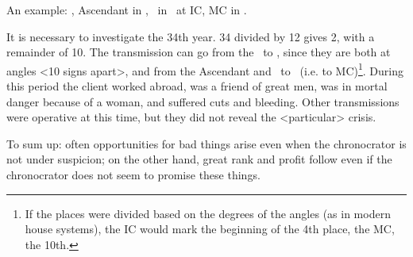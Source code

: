 An example: \Mars, Ascendant in \Virgo, \Moon\, in \Scorpio\, at IC, MC in \Taurus. 


It is necessary to investigate the 34th year. 34 divided by 12 gives 2, with a remainder of 10. The transmission can go from the \Moon\, to \Mars, since they are both at angles <10 signs apart>, and from the Ascendant and \Mars\, to \Taurus\, (i.e. to MC)\footnote{If the places were divided based on the degrees of the angles (as in modern house systems), the IC would mark the beginning of the 4th place, the MC, the 10th.}. During this period the client worked abroad, was a friend of great men, was in mortal danger because of a woman, and suffered cuts and bleeding. Other transmissions were operative at this time, but they did not reveal the <particular> crisis.

To sum up: often opportunities for bad things arise even when the chronocrator is not under suspicion; on the other hand, great rank and profit follow even if the chronocrator does not seem to promise these
things.


\newpage